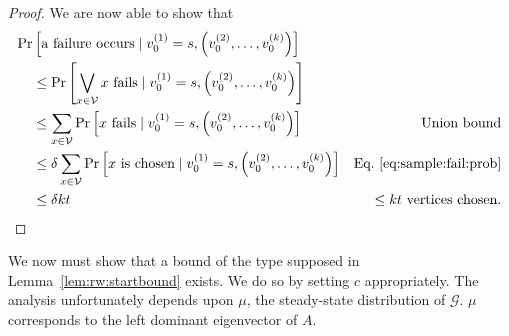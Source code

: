 \documentclass{report}
\begin{document}
\begin{proof}
We are now able to show that
%
\begin{align*}
\Pr& \left [ \textnormal{a failure occurs} \mid v_0^{(1)} = s, \left (v_0^{(2)}, \dots, v_0^{(k)} \right ) \right ]
&\\
&\leq 
\Pr \left [ \bigvee_{x \in \mathcal{V}} \textnormal{$x$ fails} \mid v_0^{(1)} = s, \left (v_0^{(2)}, \dots, v_0^{(k)} \right )\right ]
&\\
&\leq
\sum_{x \in \mathcal{V}} \Pr \left [ \textnormal{$x$ fails} \mid v_0^{(1)} = s, \left (v_0^{(2)}, \dots, v_0^{(k)} \right ) \right ] 
& \textnormal{Union bound}\\
&\leq
\delta \sum_{x \in \mathcal{V}} \Pr \left [ \textnormal{$x$ is chosen} \mid v_0^{(1)} = s, \left (v_0^{(2)}, \dots, v_0^{(k)} \right ) \right ] 
& \textnormal{Eq.~\ref{eq:sample:fail:prob}}\\
&\leq
\delta kt
& \textnormal{$\leq kt$ vertices chosen}.
\end{align*}
\end{proof}

We now must show that a bound of the type supposed in Lemma~\ref{lem:rw:startbound} exists.
We do so by setting $c$ appropriately. 
The analysis unfortunately depends upon $\mu$, the steady-state distribution of $\mathcal{G}$.
$\mu$ corresponds to the left dominant eigenvector of $A$. 
\end{document}
